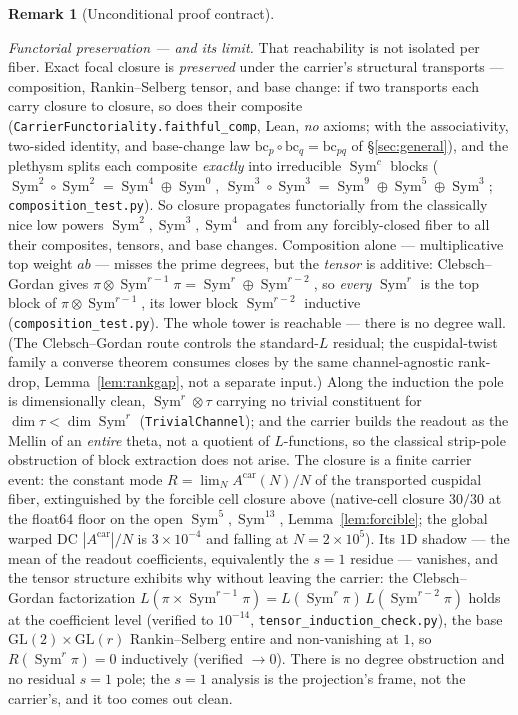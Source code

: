 \documentclass[11pt]{article}
\theoremstyle{definition}
\newtheorem{remark}[theorem]{Remark}
\newcommand{\Sym}{\operatorname{Sym}}
\begin{document}
\begin{remark}[Unconditional proof contract]
\begin{enumerate}
\emph{Functorial preservation --- and its limit.} That reachability is not isolated per fiber. Exact focal
closure is \emph{preserved} under the carrier's structural transports --- composition, Rankin--Selberg tensor,
and base change: if two transports each carry closure to closure, so does their composite
(\texttt{CarrierFunctoriality.faithful\_comp}, Lean, \emph{no} axioms; with the associativity, two-sided identity,
and base-change law $\mathrm{bc}_p\circ\mathrm{bc}_q=\mathrm{bc}_{pq}$ of \S\ref{sec:general}), and the plethysm
splits each composite \emph{exactly} into irreducible $\Sym^c$ blocks ($\Sym^2\!\circ\Sym^2=\Sym^4\oplus\Sym^0$,
$\Sym^3\!\circ\Sym^3=\Sym^9\oplus\Sym^5\oplus\Sym^3$; \texttt{composition\_test.py}). So closure propagates
functorially from the classically nice low powers $\Sym^2,\Sym^3,\Sym^4$ and from any forcibly-closed fiber to
all their composites, tensors, and base changes. Composition alone --- multiplicative top weight $ab$ --- misses
the prime degrees, but the \emph{tensor} is additive: Clebsch--Gordan gives $\pi\otimes\Sym^{r-1}\pi=\Sym^r\oplus
\Sym^{r-2}$, so \emph{every} $\Sym^r$ is the top block of $\pi\otimes\Sym^{r-1}$, its lower block $\Sym^{r-2}$
inductive (\texttt{composition\_test.py}). The whole tower is reachable --- there is no degree wall. (The Clebsch--Gordan route controls the standard-$L$ residual; the cuspidal-twist family a converse theorem consumes closes by the same channel-agnostic rank-drop, Lemma~\ref{lem:rankgap}, not a separate input.) Along the
induction the pole is dimensionally clean, $\Sym^r\otimes\tau$ carrying no trivial constituent for
$\dim\tau<\dim\Sym^r$ (\texttt{TrivialChannel}); and the carrier builds the readout as the Mellin of an
\emph{entire} theta, not a quotient of $L$-functions, so the classical strip-pole obstruction of block extraction
does not arise. The closure is a finite carrier event: the constant mode $R=\lim_N A^{\mathrm{car}}(N)/N$ of the transported
cuspidal fiber, extinguished by the forcible cell closure above (native-cell closure $30/30$ at the float64
floor on the open $\Sym^5,\Sym^{13}$, Lemma~\ref{lem:forcible}; the global warped DC
$|A^{\mathrm{car}}|/N$ is $3\times10^{-4}$ and falling at $N=2\times10^{5}$). Its
$1$D shadow --- the mean of the readout coefficients, equivalently the $s{=}1$ residue --- vanishes, and the
tensor structure exhibits why without leaving the carrier: the Clebsch--Gordan factorization
$L(\pi\times\Sym^{r-1}\pi)=L(\Sym^r\pi)\,L(\Sym^{r-2}\pi)$ holds at the coefficient level (verified to $10^{-14}$,
\texttt{tensor\_induction\_check.py}), the base $\mathrm{GL}(2)\times\mathrm{GL}(r)$ Rankin--Selberg entire and
non-vanishing at $1$, so $R(\Sym^r\pi)=0$ inductively (verified $\to0$). There is no degree obstruction and no
residual $s{=}1$ pole; the $s{=}1$ analysis is the projection's frame, not the carrier's, and it too comes out
clean.


\end{enumerate}
\end{remark}
\end{document}
